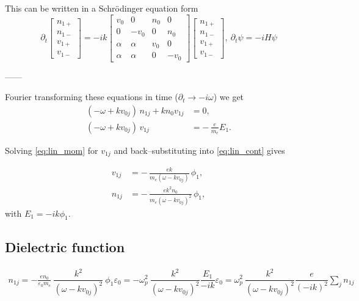 This can be written in a Schrödinger equation form 
\begin{equation}
    \partial_t \begin{bmatrix}
        n_{1+}\\n_{1-}\\v_{1+}\\v_{1-}
    \end{bmatrix} = -ik \begin{bmatrix}
        v_0 & 0 & n_0 & 0\\
        0& -v_0 & 0 & n_0\\
        \alpha & \alpha & v_0 & 0\\
        \alpha & \alpha & 0 & -v_0
    \end{bmatrix} \begin{bmatrix}
        n_{1+}\\n_{1-}\\v_{1+}\\v_{1-}
    \end{bmatrix}, ~\partial_t \psi = -i H \psi
\end{equation}

------

Fourier transforming these equations in time ($\partial_t \rightarrow -i \omega$) we get
\begin{align}
    (-\omega + k v_{0j})\, n_{1j} + k n_0 v_{1j} &= 0, \label{eq:lin_cont}\\
    (-\omega + k v_{0j})\, v_{1j} &= -\,\frac{e}{m_e} E_1. \label{eq:lin_mom}
\end{align}

Solving \ref{eq:lin_mom} for $v_{1j}$ and back--substituting into \ref{eq:lin_cont} gives
    
\begin{align}
    v_{1j} &= -\,\frac{e k}{m_e(\omega - k v_{0j})}\,\phi_1,\\
    n_{1j} &= -\,\frac{e k^{2} n_0}{m_e(\omega - k v_{0j})^{2}}\,\phi_1,
\end{align}
with $E_1 = -i k \phi_1$.

\subsection{Dielectric function}

\begin{align}
    n_{1j} = -\frac{e  n_0}{\varepsilon_0 m_e} ~\dfrac{k^{2}}{(\omega - k v_{0j})^{2}}~\phi_1 \varepsilon_0 = -\omega_p^2 ~\dfrac{k^{2}}{(\omega - k v_{0j})^{2}} \dfrac{E_1}{-ik} \varepsilon_0 = \omega_p^2 ~\dfrac{k^{2}}{(\omega - k v_{0j})^{2}} \dfrac{e}{(-ik)^2} \sum_j n_{1j}
\end{align}

